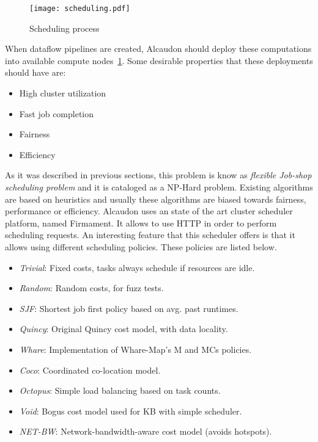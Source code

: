 \begin{figure}[!h]
  \centering
  \texttt{[image: scheduling.pdf]}
  \caption{Scheduling process}
  \label{fig:scheduler}
\end{figure}

When dataflow pipelines are created, Alcaudon should deploy these computations
into available compute nodes~\ref{fig:scheduler}. Some desirable properties that
these deployments should have are:

\begin{itemize}
\item High cluster utilization
\item Fast job completion
\item Fairness
\item Efficiency
\end{itemize}

As it was described in previous sections, this problem is know as
\textit{flexible Job-shop scheduling problem} and it is cataloged as a NP-Hard
problem. Existing algorithms are based on heuristics and usually these
algorithms are biased towards fairness, performance or efficiency.
Alcaudon uses an state of the art cluster scheduler platform\cite{firmament},
named Firmament. It allows to use \acf{HTTP} in order to perform scheduling
requests. An interesting feature that this scheduler offers is that it allows
using different scheduling policies. These policies are listed below.

\begin{itemize}
\item \textit{Trivial}: Fixed costs, tasks always schedule if resources are idle.
\item \textit{Random}: Random costs, for fuzz tests.
\item \textit{SJF}: Shortest job first policy based on avg. past runtimes.
\item \textit{Quincy}: Original Quincy cost model, with data locality.       
\item \textit{Whare}: Implementation of Whare-Map's M and MCs policies.
\item \textit{Coco}: Coordinated co-location model.
\item \textit{Octopus}: Simple load balancing based on task counts.     
\item \textit{Void}: Bogus cost model used for KB with simple scheduler.  
\item \textit{NET-BW}: Network-bandwidth-aware cost model (avoids hotspots).  
\end{itemize}

